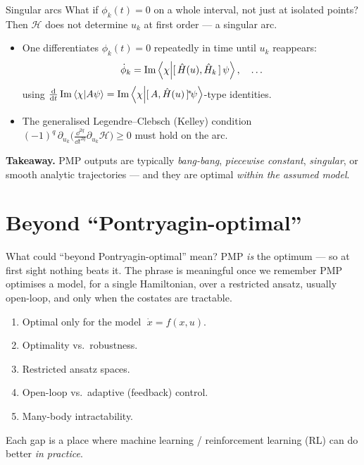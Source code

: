 \documentclass[10pt,aspectratio=169]{beamer}
\newcommand{\Hop}{\hat H}
\newcommand{\Hc}{\mathcal{H}}                 %
\renewcommand{\Im}{\operatorname{Im}}
\newcommand{\dt}{\frac{\dd}{\dd t}}
\begin{document}
\begin{frame}{Singular arcs}
  What if $\phi_k(t)=0$ on a whole interval, not just at isolated points?
  Then $\Hc$ does not determine $u_k$ at first order --- a \alert{singular arc}.
  \begin{itemize}
    \item One differentiates $\phi_k(t)=0$ repeatedly in time until $u_k$
          reappears:
          \[
            \dot\phi_k = \Im\braket{\chi}{[\,\Hop(u),\Hop_k\,]\,\psi}, \quad\ldots
          \]
          using $\dt\Im\braket{\chi}{A\psi}=\Im\braket{\chi}{[\,A,\Hop(u)\,]^{\!*}\!\psi}$-type identities.
    \item The \alert{generalised Legendre--Clebsch (Kelley) condition}
          $(-1)^q\,\partial_{u_k}\!\big(\tfrac{\dd^{2q}}{\dd t^{2q}}\partial_{u_k}\Hc\big)\ge 0$
          must hold on the arc.
  \end{itemize}
  \vspace{0.4em}
  \textbf{Takeaway.} PMP outputs are typically \emph{bang-bang}, \emph{piecewise
  constant}, \emph{singular}, or smooth analytic trajectories --- and they are
  optimal \emph{within the assumed model}.
\end{frame}

\section{Beyond ``Pontryagin-optimal''}

\begin{frame}{What could ``beyond Pontryagin-optimal'' mean?}
  PMP \emph{is} the optimum --- so at first sight nothing beats it. The phrase
  is meaningful once we remember PMP optimises a \alert{model}, for a
  \alert{single} Hamiltonian, over a \alert{restricted} ansatz, usually
  \alert{open-loop}, and only when the costates are \alert{tractable}.
  \begin{enumerate}
    \item Optimal only for the model $\;\dot x = f(x,u)$.
    \item Optimality vs.\ robustness.
    \item Restricted ansatz spaces.
    \item Open-loop vs.\ adaptive (feedback) control.
    \item Many-body intractability.
  \end{enumerate}
  \vspace{0.4em}
  Each gap is a place where machine learning / reinforcement learning (RL) can
  do better \emph{in practice}.
\end{frame}
\end{document}
